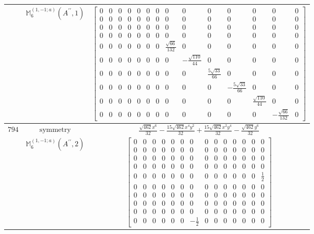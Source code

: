 \documentclass[fleqn,8pt,landscape]{jsarticle}
\begin{document}
\begin{longtable}{ccc}
$  $ & $ \mathbb{M}_{6}^{(1,-1;a)}(A^{\prime\prime},1) $ & $ \begin{bmatrix} 0 & 0 & 0 & 0 & 0 & 0 & 0 & 0 & 0 & 0 & 0 & 0 & 0 & 0 \\ 0 & 0 & 0 & 0 & 0 & 0 & 0 & 0 & 0 & 0 & 0 & 0 & 0 & 0 \\ 0 & 0 & 0 & 0 & 0 & 0 & 0 & 0 & 0 & 0 & 0 & 0 & 0 & 0 \\ 0 & 0 & 0 & 0 & 0 & 0 & 0 & 0 & 0 & 0 & 0 & 0 & 0 & 0 \\ 0 & 0 & 0 & 0 & 0 & 0 & 0 & \frac{\sqrt{66}}{132} & 0 & 0 & 0 & 0 & 0 & 0 \\ 0 & 0 & 0 & 0 & 0 & 0 & 0 & 0 & - \frac{\sqrt{110}}{44} & 0 & 0 & 0 & 0 & 0 \\ 0 & 0 & 0 & 0 & 0 & 0 & 0 & 0 & 0 & \frac{5 \sqrt{33}}{66} & 0 & 0 & 0 & 0 \\ 0 & 0 & 0 & 0 & 0 & 0 & 0 & 0 & 0 & 0 & - \frac{5 \sqrt{33}}{66} & 0 & 0 & 0 \\ 0 & 0 & 0 & 0 & 0 & 0 & 0 & 0 & 0 & 0 & 0 & \frac{\sqrt{110}}{44} & 0 & 0 \\ 0 & 0 & 0 & 0 & 0 & 0 & 0 & 0 & 0 & 0 & 0 & 0 & - \frac{\sqrt{66}}{132} & 0 \end{bmatrix} $ \\ \hline
$ 794 $ & $ \text{symmetry} $ & $ \frac{\sqrt{462} x^{6}}{32} - \frac{15 \sqrt{462} x^{4} y^{2}}{32} + \frac{15 \sqrt{462} x^{2} y^{4}}{32} - \frac{\sqrt{462} y^{6}}{32} $ \\
$  $ & $ \mathbb{M}_{6}^{(1,-1;a)}(A^{\prime\prime},2) $ & $ \begin{bmatrix} 0 & 0 & 0 & 0 & 0 & 0 & 0 & 0 & 0 & 0 & 0 & 0 & 0 & 0 \\ 0 & 0 & 0 & 0 & 0 & 0 & 0 & 0 & 0 & 0 & 0 & 0 & 0 & 0 \\ 0 & 0 & 0 & 0 & 0 & 0 & 0 & 0 & 0 & 0 & 0 & 0 & 0 & 0 \\ 0 & 0 & 0 & 0 & 0 & 0 & 0 & 0 & 0 & 0 & 0 & 0 & 0 & 0 \\ 0 & 0 & 0 & 0 & 0 & 0 & 0 & 0 & 0 & 0 & 0 & 0 & 0 & \frac{1}{2} \\ 0 & 0 & 0 & 0 & 0 & 0 & 0 & 0 & 0 & 0 & 0 & 0 & 0 & 0 \\ 0 & 0 & 0 & 0 & 0 & 0 & 0 & 0 & 0 & 0 & 0 & 0 & 0 & 0 \\ 0 & 0 & 0 & 0 & 0 & 0 & 0 & 0 & 0 & 0 & 0 & 0 & 0 & 0 \\ 0 & 0 & 0 & 0 & 0 & 0 & 0 & 0 & 0 & 0 & 0 & 0 & 0 & 0 \\ 0 & 0 & 0 & 0 & 0 & 0 & - \frac{1}{2} & 0 & 0 & 0 & 0 & 0 & 0 & 0 \end{bmatrix} $ \\ \hline

\end{longtable}
\end{document}
